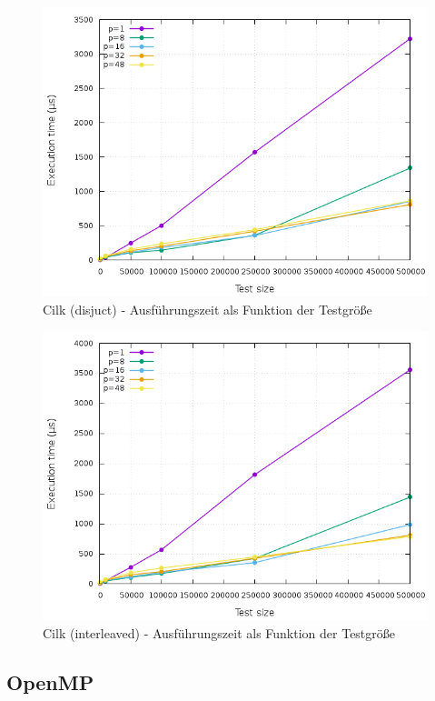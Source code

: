 \begin{figure}[htbp]
	\centering
	\includegraphics[width=404pt]{resources/plots/Cilk_Disjunct_cores.png}
	\caption{Cilk (disjuct) - Ausführungszeit als Funktion der Testgröße}
	\label{Cilk_Disjunct_cores}
\end{figure}


\begin{figure}[htbp]
	\centering
	\includegraphics[width=404pt]{resources/plots/Cilk_Interleaved_cores.png}
	\caption{Cilk (interleaved) - Ausführungszeit als Funktion der Testgröße}
	\label{Cilk_Interleaved_cores}
\end{figure}



\subsection{OpenMP}

